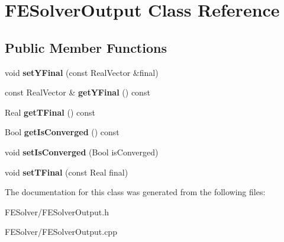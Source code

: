 \hypertarget{classFESolverOutput}{
\section{FESolverOutput Class Reference}
\label{classFESolverOutput}
}
\subsection*{Public Member Functions}
\begin{DoxyCompactItemize}
\item 
\hypertarget{classFESolverOutput_a890577c0649e10516ef34c9fc027d058}{
void {\bfseries setYFinal} (const RealVector \&final)}
\label{classFESolverOutput_a890577c0649e10516ef34c9fc027d058}

\item 
\hypertarget{classFESolverOutput_addc33a0512e2e53c6f9b3a845b9759a5}{
const RealVector \& {\bfseries getYFinal} () const }
\label{classFESolverOutput_addc33a0512e2e53c6f9b3a845b9759a5}

\item 
\hypertarget{classFESolverOutput_a0648c1129ea238be4b20889e2b1726cb}{
Real {\bfseries getTFinal} () const }
\label{classFESolverOutput_a0648c1129ea238be4b20889e2b1726cb}

\item 
\hypertarget{classFESolverOutput_a1e060bdb866aa2f89d62f5e191b39c32}{
Bool {\bfseries getIsConverged} () const }
\label{classFESolverOutput_a1e060bdb866aa2f89d62f5e191b39c32}

\item 
\hypertarget{classFESolverOutput_ab1edc441da120ef956fcfd647352e0e2}{
void {\bfseries setIsConverged} (Bool isConverged)}
\label{classFESolverOutput_ab1edc441da120ef956fcfd647352e0e2}

\item 
\hypertarget{classFESolverOutput_aa4150e5690c01bf135659b8f86cbd39d}{
void {\bfseries setTFinal} (const Real final)}
\label{classFESolverOutput_aa4150e5690c01bf135659b8f86cbd39d}

\end{DoxyCompactItemize}


The documentation for this class was generated from the following files:\begin{DoxyCompactItemize}
\item 
FESolver/FESolverOutput.h\item 
FESolver/FESolverOutput.cpp\end{DoxyCompactItemize}
